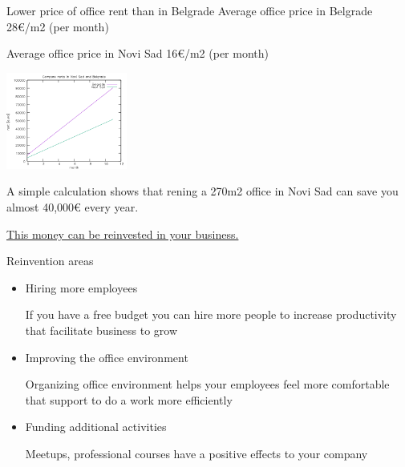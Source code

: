 \documentclass[presentation]{beamer}
\begin{document}
\begin{frame}[label={sec:org1cb4336}]{Lower price of office rent than in Belgrade}
Average office price in Belgrade \alert{28€/m2} (per month)

Average office price in Novi Sad \alert{16€/m2} (per month)

\begin{center}
\includegraphics[width=150px]{CompareRents.png}
\end{center}

A simple calculation shows that rening a 270m2 office in Novi Sad can save you almost \alert{40,000€} every year.

\uline{This money can be reinvested in your business.}
\end{frame}
\begin{frame}[label={sec:orgd95f009}]{Reinvention areas}
\begin{itemize}
\item Hiring more employees

If you have a free budget you can hire more people to increase productivity that facilitate business to grow
\item Improving the office environment

Organizing office environment helps your employees feel more comfortable that support to do a work more efficiently
\item Funding additional activities

Meetups, professional courses have a positive effects to your company
\end{itemize}
\end{frame}
\end{document}
